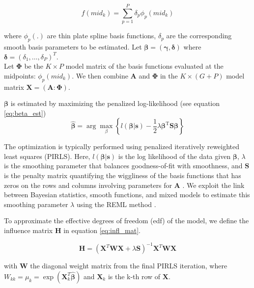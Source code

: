 \begin{equation}
    f(mid_k) = \sum_{p=1}^{P}\delta_p\phi_p(mid_k)
    \label{eq:splines}
\end{equation}

where $\phi_p(.)$ are thin plate spline basis functions, $\delta_p$ are the corresponding smooth basis parameters to be estimated. Let $\boldsymbol{{\beta}} = (\boldsymbol{\gamma},\boldsymbol{\delta})$ where $\boldsymbol{\delta} = (\delta_1,\dots, \delta_P)^T$.\\
Let $\boldsymbol{\Phi}$ be the $K \times P$ model matrix of the basis functions evaluated at the midpoints: $\phi_p(mid_k)$.
We then combine $\boldsymbol{A}$ and $\boldsymbol{\Phi}$ in the $K \times (G+P)$ model matrix $\boldsymbol{X} = (\boldsymbol{A} : \boldsymbol{\Phi})$.

$\boldsymbol{\beta}$ is estimated by maximizing the penalized log-likelihood (see equation \ref{eq:beta_est})
\begin{equation}
    \hat{\boldsymbol{\beta}}=\arg \max _{\beta}\left\{l(\boldsymbol{\beta}|\boldsymbol{s})-\frac{1}{2} \lambda \boldsymbol{\beta}^{\mathrm{T}} \boldsymbol{S} \boldsymbol{\beta}\right\}
    \label{eq:beta_est}
\end{equation}

The optimization is typically performed using penalized iteratively reweighted least squares (PIRLS). Here, $l(\boldsymbol{\beta}|\boldsymbol{s})$ is the log likelihood of the data given $\boldsymbol{\beta}$, $\lambda$ is the smoothing parameter that balances goodness-of-fit with smoothness, and $\boldsymbol{S}$ is the penalty matrix quantifying the wiggliness of the basis functions that has zeros on the rows and columns involving parameters for $\boldsymbol{A}$ \cite{gambook_gamtheory_setup}. We exploit the link between Bayesian statistics, smooth functions, and mixed models to estimate this smoothing parameter $\lambda$ using the REML method \cite{gambook_gamtheory_reml, ruppert_reml}.

To approximate the effective degrees of freedom (edf) of the model, we define the influence matrix $\boldsymbol{H}$ in equation \ref{eq:infl_mat}.

\begin{equation}
    \boldsymbol{H} = (\boldsymbol{X}^T\boldsymbol{W}\boldsymbol{X} + \lambda \boldsymbol{S})^{-1}\boldsymbol{X}^T\boldsymbol{W}\boldsymbol{X}
    \label{eq:infl_mat}
\end{equation}

with $\boldsymbol{W}$ the diagonal weight matrix from the final PIRLS iteration, where $W_{kk} = \mu_k = \exp(\boldsymbol{X}_k^T \hat{\boldsymbol{\beta}})$ and $\boldsymbol{X}_k$ is the k-th row of $\boldsymbol{X}$.

